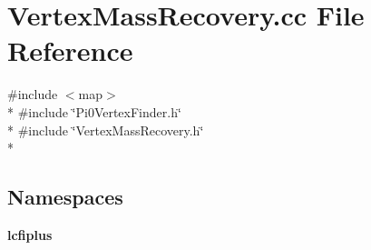 \section{Vertex\-Mass\-Recovery.\-cc File Reference}
\label{VertexMassRecovery_8cc}
{\ttfamily \#include $<$map$>$}\\*
{\ttfamily \#include \char`\"{}Pi0\-Vertex\-Finder.\-h\char`\"{}}\\*
{\ttfamily \#include \char`\"{}Vertex\-Mass\-Recovery.\-h\char`\"{}}\\*
\subsection*{Namespaces}
\begin{DoxyCompactItemize}
\item 
{\bf lcfiplus}
\end{DoxyCompactItemize}
